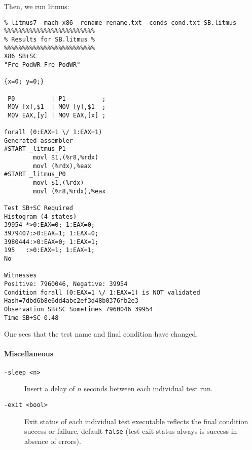 Then, we run litmus:
\begin{verbatim}
% litmus7 -mach x86 -rename rename.txt -conds cond.txt SB.litmus
%%%%%%%%%%%%%%%%%%%%%%%%%
% Results for SB.litmus %
%%%%%%%%%%%%%%%%%%%%%%%%%
X86 SB+SC
"Fre PodWR Fre PodWR"

{x=0; y=0;}

 P0          | P1          ;
 MOV [x],$1  | MOV [y],$1  ;
 MOV EAX,[y] | MOV EAX,[x] ;

forall (0:EAX=1 \/ 1:EAX=1)
Generated assembler
#START _litmus_P1
        movl $1,(%r8,%rdx)
        movl (%rdx),%eax
#START _litmus_P0
        movl $1,(%rdx)
        movl (%r8,%rdx),%eax

Test SB+SC Required
Histogram (4 states)
39954 *>0:EAX=0; 1:EAX=0;
3979407:>0:EAX=1; 1:EAX=0;
3980444:>0:EAX=0; 1:EAX=1;
195   :>0:EAX=1; 1:EAX=1;
No

Witnesses
Positive: 7960046, Negative: 39954
Condition forall (0:EAX=1 \/ 1:EAX=1) is NOT validated
Hash=7dbd6b8e6dd4abc2ef3d48b0376fb2e3
Observation SB+SC Sometimes 7960046 39954
Time SB+SC 0.48
\end{verbatim}
One sees that the test name and final condition have changed.

\paragraph*{Miscellaneous\label{misc}}
\begin{description}
\item[{\tt -sleep <n>}] Insert a delay of $n$ seconds between each individual test run.
\item[{\tt -exit <bool>}] Exit status of each individual test executable reflects the final condition success or failure, default \texttt{false} (test exit status always is success in absence  of errors).
\end{description}

